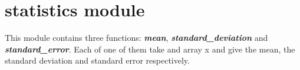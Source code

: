 \section{statistics module}

This module contains three functions: \textit{\textbf{mean}}, \textit{\textbf{standard\_deviation}} and \textit{\textbf{standard\_error}}. Each of one of them take and array x and give the mean, the standard deviation and standard error respectively.